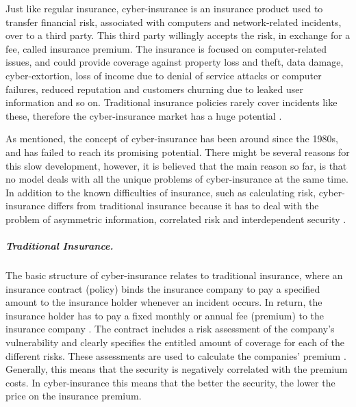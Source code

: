 Just like regular insurance, cyber-insurance is an insurance product used to transfer financial risk, associated with computers and network-related incidents, over to a third party. This third party willingly accepts the risk, in exchange for a fee, called insurance premium.
The insurance is focused on computer-related issues, and could provide coverage against property loss and theft, data damage, cyber-extortion, loss of income due to denial of service attacks or computer failures, reduced reputation and customers churning due to leaked user information and so on. Traditional insurance policies rarely cover incidents like these, therefore the cyber-insurance market has a huge potential \cite{washingtonpaper}.

As mentioned, the concept of cyber-insurance has been around since the 1980s, and has failed to reach its promising potential. There might be several reasons for this slow development, however, it is believed that the main reason so far, is that no model deals with all the unique problems of cyber-insurance at the same time. In addition to the known difficulties of insurance, such as calculating risk, cyber-insurance differs from traditional insurance because it has to deal with the problem of asymmetric information, correlated risk and interdependent security \cite{networkgames}.  

\subparagraph{Traditional Insurance.} 
The basic structure of cyber-insurance relates to traditional insurance, where an insurance contract (policy) binds the insurance company to pay a specified amount to the insurance holder whenever an incident occurs. In return, the insurance holder has to pay a fixed monthly or annual fee (premium) to the insurance company \cite{robinson2012incentives}. The contract includes a risk assessment of the company's vulnerability and clearly specifies the entitled amount of coverage for each of the different risks. These assessments are used to calculate the companies' premium \cite{robinson2012incentives}. Generally, this means that the security is negatively correlated with the premium costs. In cyber-insurance this means that the better the security, the lower the price on the insurance premium.
   
